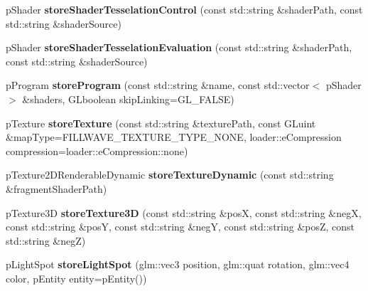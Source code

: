 \begin{DoxyCompactItemize}
\item 
\hypertarget{classfillwave_1_1Engine_ac076814ab5f44ce033fa0bc1cb8e0500}{}p\+Shader {\bfseries store\+Shader\+Tesselation\+Control} (const std\+::string \&shader\+Path, const std\+::string \&shader\+Source)\label{classfillwave_1_1Engine_ac076814ab5f44ce033fa0bc1cb8e0500}

\item 
\hypertarget{classfillwave_1_1Engine_af226a5bf69d8380adb04d3e53ee41689}{}p\+Shader {\bfseries store\+Shader\+Tesselation\+Evaluation} (const std\+::string \&shader\+Path, const std\+::string \&shader\+Source)\label{classfillwave_1_1Engine_af226a5bf69d8380adb04d3e53ee41689}

\item 
\hypertarget{classfillwave_1_1Engine_ad8cbc06ff1f9bba8e3cef59a3c876126}{}p\+Program {\bfseries store\+Program} (const std\+::string \&name, const std\+::vector$<$ p\+Shader $>$ \&shaders, G\+Lboolean skip\+Linking=G\+L\+\_\+\+F\+A\+L\+S\+E)\label{classfillwave_1_1Engine_ad8cbc06ff1f9bba8e3cef59a3c876126}

\item 
\hypertarget{classfillwave_1_1Engine_ad4bde7a3e530211b7aa9ed273e055ff9}{}p\+Texture {\bfseries store\+Texture} (const std\+::string \&texture\+Path, const G\+Luint \&map\+Type=F\+I\+L\+L\+W\+A\+V\+E\+\_\+\+T\+E\+X\+T\+U\+R\+E\+\_\+\+T\+Y\+P\+E\+\_\+\+N\+O\+N\+E, loader\+::e\+Compression compression=loader\+::e\+Compression\+::none)\label{classfillwave_1_1Engine_ad4bde7a3e530211b7aa9ed273e055ff9}

\item 
\hypertarget{classfillwave_1_1Engine_a8defb3db1fc8882f967c012a79afeff0}{}p\+Texture2\+D\+Renderable\+Dynamic {\bfseries store\+Texture\+Dynamic} (const std\+::string \&fragment\+Shader\+Path)\label{classfillwave_1_1Engine_a8defb3db1fc8882f967c012a79afeff0}

\item 
\hypertarget{classfillwave_1_1Engine_a3c3207e65c948a73ddb07021687c4a35}{}p\+Texture3\+D {\bfseries store\+Texture3\+D} (const std\+::string \&pos\+X, const std\+::string \&neg\+X, const std\+::string \&pos\+Y, const std\+::string \&neg\+Y, const std\+::string \&pos\+Z, const std\+::string \&neg\+Z)\label{classfillwave_1_1Engine_a3c3207e65c948a73ddb07021687c4a35}

\item 
\hypertarget{classfillwave_1_1Engine_acef6ad430f102bca3d6975c4a2c3f17a}{}p\+Light\+Spot {\bfseries store\+Light\+Spot} (glm\+::vec3 position, glm\+::quat rotation, glm\+::vec4 color, p\+Entity entity=p\+Entity())\label{classfillwave_1_1Engine_acef6ad430f102bca3d6975c4a2c3f17a}


\end{DoxyCompactItemize}
